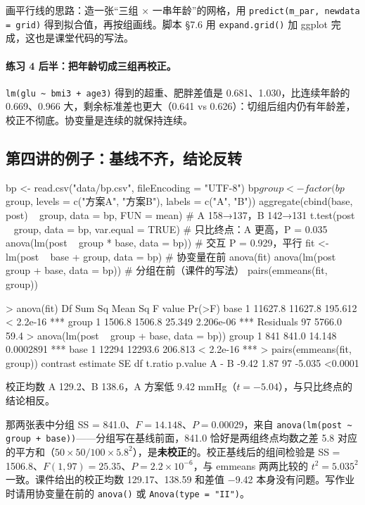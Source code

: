 画平行线的思路：造一张“三组 × 一串年龄”的网格，用 \Verb|predict(m_par, newdata = grid)| 得到拟合值，再按组画线。脚本 §7.6 用 \Verb|expand.grid()| 加 ggplot 完成，这也是课堂代码的写法。

\paragraph{练习 4 后半：把年龄切成三组再校正。}\Verb|lm(glu ~ bmi3 + age3)| 得到的超重、肥胖差值是 0.681、1.030，比连续年龄的 0.669、0.966 大，剩余标准差也更大（0.641 vs 0.626）：切组后组内仍有年龄差，校正不彻底。协变量是连续的就保持连续。

\subsection{第四讲的例子：基线不齐，结论反转}
\label{sec:bp}
\begin{RCode}[R · bp.csv]
bp <- read.csv("data/bp.csv", fileEncoding = "UTF-8")
bp$group <- factor(bp$group, levels = c("方案A", "方案B"), labels = c("A", "B"))
aggregate(cbind(base, post) ~ group, data = bp, FUN = mean)   # A 158→137，B 142→131
t.test(post ~ group, data = bp, var.equal = TRUE)             # 只比终点：A 更高，P = 0.035
anova(lm(post ~ group * base, data = bp))                     # 交互 P = 0.929，平行
fit <- lm(post ~ base + group, data = bp)                     # 协变量在前
anova(fit)
anova(lm(post ~ group + base, data = bp))                     # 分组在前（课件的写法）
pairs(emmeans(fit, ~ group))
\end{RCode}
\begin{ROut}
> anova(fit)
          Df  Sum Sq Mean Sq F value    Pr(>F)
base       1 11627.8 11627.8 195.612 < 2.2e-16 ***
group      1  1506.8  1506.8  25.349 2.206e-06 ***
Residuals 97  5766.0    59.4
> anova(lm(post ~ group + base, data = bp))
group      1    841   841.0  14.148 0.0002891 ***
base       1  12294 12293.6 206.813 < 2.2e-16 ***
> pairs(emmeans(fit, ~ group))
 contrast estimate   SE df t.ratio p.value
 A - B       -9.42 1.87 97  -5.035 <0.0001
\end{ROut}
校正均数 A 129.2、B 138.6，A 方案低 9.42 mmHg（$t=-5.04$），与只比终点的结论相反。

\begin{notebox}
那两张表中分组 SS = 841.0、$F=14.148$、$P=0.00029$，来自 \Verb|anova(lm(post ~ group + base))|——分组写在基线前面，841.0 恰好是两组终点均数之差 5.8 对应的平方和（$50\times50/100\times5.8^2$），是\textbf{未校正}的。校正基线后的组间检验是 SS = 1506.8、$F(1,97)=25.35$、$P=2.2\times10^{-6}$，与 emmeans 两两比较的 $t^2=5.035^2$ 一致。课件给出的校正均数 129.17、138.59 和差值 −9.42 本身没有问题。写作业时请用协变量在前的 \Verb|anova()| 或 \Verb|Anova(type = "II")|。
\end{notebox}

